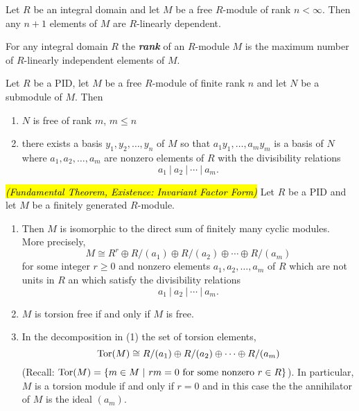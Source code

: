 \nl

\begin{prop}
Let $R$ be an integral domain and let $M$ be a free $R$-module of rank $n<\infty$. Then any $n + 1$ elements of $M$ are $R$-linearly dependent.
\end{prop}

\nl

\begin{defn}
For any integral domain $R$ the \textit{\textbf{rank}} of an $R$-module $M$ is the maximum number of $R$-linearly independent elements of $M$.
\end{defn}

\nl

\begin{thm}
Let $R$ be a PID, let $M$ be a free $R$-module of finite rank $n$ and let $N$ be a submodule of $M$. Then
\begin{enumerate}
\item $N$ is free of rank $m$, $m\leq n$
\item there exists a basis $y_1,y_2,\ldots,y_n$ of $M$ so that $a_1y_1,\ldots,a_my_m$ is a basis of $N$ where $a_1, a_2, \ldots, a_m$ are nonzero elements of $R$ with the divisibility relations
\[a_1\ |\ a_2\ |\ \cdots\ |\ a_m.\]
\end{enumerate}
\end{thm}

\nl

\begin{thm}\textit{\hl{(Fundamental Theorem, Existence: Invariant Factor Form)}}
Let $R$ be a PID and let $M$ be a finitely generated $R$-module.
\begin{enumerate}
\item Then $M$ is isomorphic to the direct sum of finitely many cyclic modules. More precisely,
\[M\cong R^r\oplus R/(a_1) \oplus R/(a_2) \oplus \cdots \oplus R/(a_m)\]
for some integer $r\geq 0$ and nonzero elements $a_1, a_2,\ldots, a_m$ of $R$ which are not units in $R$ an which satisfy the divisibility relations 
\[a_1\ |\ a_2\ |\ \cdots\ |\ a_m.\]

\item $M$ is torsion free if and only if $M$ is free.
\item In the decomposition in (1) the set of torsion elements,
\[\text{Tor}(M) \cong R/(a_1) \oplus R/(a_2) \oplus \cdots \oplus R/(a_m)\]
(Recall: $\text{Tor}(M) = \{m\in M\ |\ rm = 0\text{ for some nonzero }r\in R\}$). In particular, $M$ is a torsion module if and only if $r = 0$ and in this case the the annihilator of $M$ is the ideal $(a_m)$.
\end{enumerate}
\end{thm}

